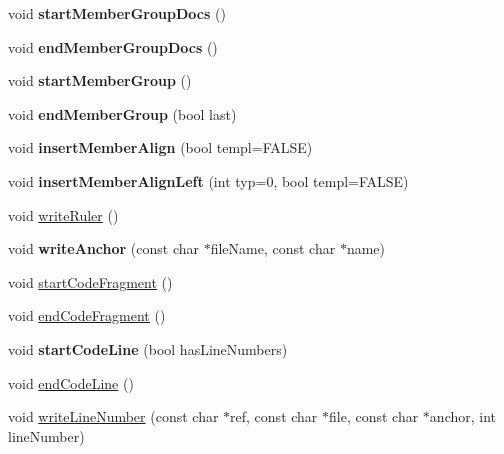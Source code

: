 \begin{DoxyCompactItemize}
\mbox{\label{class_output_list_ac78054f50bad730b62b3456699d9a350}} 
void {\bfseries start\+Member\+Group\+Docs} ()
\item 
\mbox{\label{class_output_list_a3cf86cdcd2fb2e853a0bd5be6edb1858}} 
void {\bfseries end\+Member\+Group\+Docs} ()
\item 
\mbox{\label{class_output_list_a6e6c176d640939fce848f044037209c8}} 
void {\bfseries start\+Member\+Group} ()
\item 
\mbox{\label{class_output_list_ac38b30488a0d82de3aa04b7ae30ed48e}} 
void {\bfseries end\+Member\+Group} (bool last)
\item 
\mbox{\label{class_output_list_a8a0967d0442047bfe07a5644505c2d68}} 
void {\bfseries insert\+Member\+Align} (bool templ=F\+A\+L\+SE)
\item 
\mbox{\label{class_output_list_ac7fdd2d14a673ba18c39f8961726fe59}} 
void {\bfseries insert\+Member\+Align\+Left} (int typ=0, bool templ=F\+A\+L\+SE)
\item 
void \mbox{\hyperlink{class_output_list_a2203589f0bc276cb3ba01f529b9536a9}{write\+Ruler}} ()
\item 
\mbox{\label{class_output_list_af547c76944d466ab7c66ab31b32bde13}} 
void {\bfseries write\+Anchor} (const char $\ast$file\+Name, const char $\ast$name)
\item 
void \mbox{\hyperlink{class_output_list_ae9d700d50e148d13422052cd58243624}{start\+Code\+Fragment}} ()
\item 
void \mbox{\hyperlink{class_output_list_a9fccddf083f487654f6e6ce261fafff8}{end\+Code\+Fragment}} ()
\item 
\mbox{\label{class_output_list_a4676ca4801912753ba2c5af4f38cb951}} 
void {\bfseries start\+Code\+Line} (bool has\+Line\+Numbers)
\item 
void \mbox{\hyperlink{class_output_list_a0e08c34eb6d9058342d0bd7fdc2a453d}{end\+Code\+Line}} ()
\item 
void \mbox{\hyperlink{class_output_list_a9472c77d09f7049b64dbad0c4ba13ccd}{write\+Line\+Number}} (const char $\ast$ref, const char $\ast$file, const char $\ast$anchor, int line\+Number)

\end{DoxyCompactItemize}
